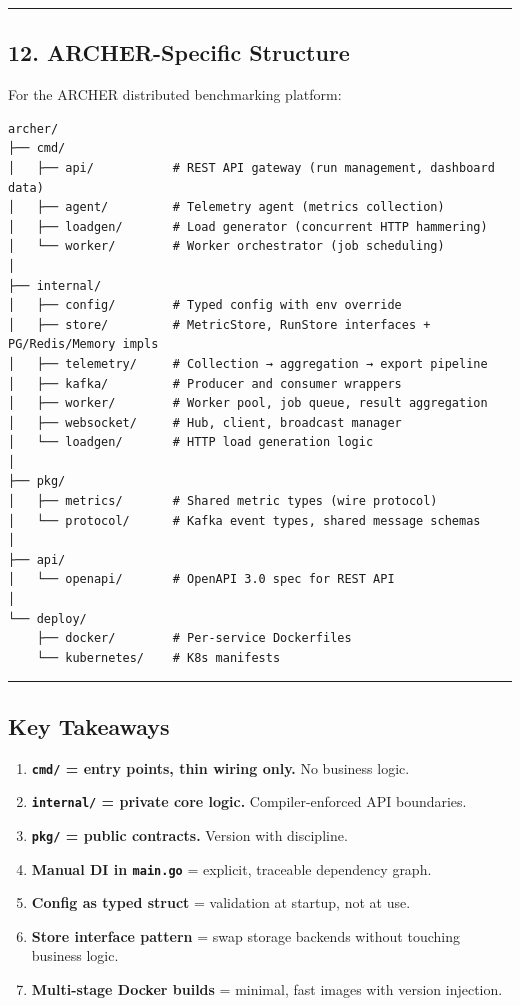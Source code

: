 \documentclass[
]{article}
\providecommand{\tightlist}{%
  \setlength{\itemsep}{0pt}\setlength{\parskip}{0pt}}
\begin{document}
\begin{center}\rule{0.5\linewidth}{0.5pt}\end{center}

\hypertarget{archer-specific-structure}{%
\subsection{12. ARCHER-Specific
Structure}\label{archer-specific-structure}}

For the ARCHER distributed benchmarking platform:

\begin{verbatim}
archer/
├── cmd/
│   ├── api/           # REST API gateway (run management, dashboard data)
│   ├── agent/         # Telemetry agent (metrics collection)
│   ├── loadgen/       # Load generator (concurrent HTTP hammering)
│   └── worker/        # Worker orchestrator (job scheduling)
│
├── internal/
│   ├── config/        # Typed config with env override
│   ├── store/         # MetricStore, RunStore interfaces + PG/Redis/Memory impls
│   ├── telemetry/     # Collection → aggregation → export pipeline
│   ├── kafka/         # Producer and consumer wrappers
│   ├── worker/        # Worker pool, job queue, result aggregation
│   ├── websocket/     # Hub, client, broadcast manager
│   └── loadgen/       # HTTP load generation logic
│
├── pkg/
│   ├── metrics/       # Shared metric types (wire protocol)
│   └── protocol/      # Kafka event types, shared message schemas
│
├── api/
│   └── openapi/       # OpenAPI 3.0 spec for REST API
│
└── deploy/
    ├── docker/        # Per-service Dockerfiles
    └── kubernetes/    # K8s manifests
\end{verbatim}

\begin{center}\rule{0.5\linewidth}{0.5pt}\end{center}

\hypertarget{key-takeaways-1}{%
\subsection{Key Takeaways}\label{key-takeaways-1}}

\begin{enumerate}
\def\labelenumi{\arabic{enumi}.}
\tightlist
\item
  \textbf{\texttt{cmd/} = entry points, thin wiring only.} No business
  logic.
\item
  \textbf{\texttt{internal/} = private core logic.} Compiler-enforced
  API boundaries.
\item
  \textbf{\texttt{pkg/} = public contracts.} Version with discipline.
\item
  \textbf{Manual DI in \texttt{main.go}} = explicit, traceable
  dependency graph.
\item
  \textbf{Config as typed struct} = validation at startup, not at use.
\item
  \textbf{Store interface pattern} = swap storage backends without
  touching business logic.
\item
  \textbf{Multi-stage Docker builds} = minimal, fast images with version
  injection.
\end{enumerate}
\end{document}

